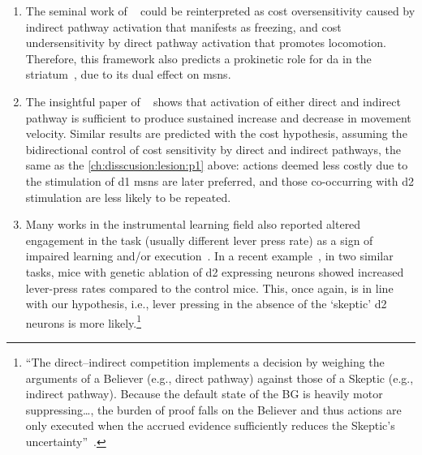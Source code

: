 \begin{enumerate}[noitemsep, label=\Roman*.]
    \item \label{ch:disscusion:lesion:p1} The seminal work of \citeauthor{Kravitz2010Nature}~\cite{Kravitz2010Nature} could be reinterpreted as cost oversensitivity caused by indirect pathway activation that manifests as freezing, and cost undersensitivity by direct pathway activation that promotes locomotion.
    Therefore, this framework also predicts a prokinetic role for \gls{da} in the striatum~\cite{Howe2016N}, due to its dual effect on \glspl{msn}.
    \item The insightful paper of ~\cite{Yttri2016Nature} shows that activation of either direct and indirect pathway is sufficient to produce sustained increase and decrease in movement velocity.
    Similar results are predicted with the cost hypothesis, assuming the bidirectional control of cost sensitivity by direct and indirect pathways, the same as the \autoref{ch:disscusion:lesion:p1} above:
    actions deemed less costly due to the stimulation of \gls{d1} \glspl{msn} are later preferred, and those co-occurring with \gls{d2} stimulation are less likely to be repeated.
    \item Many works in the instrumental learning field also reported altered engagement in the task (usually different lever press rate) as a sign of impaired learning and/or execution~\cite{Hart2018CurrBiol}.
    In a recent example~\cite{Matamales2020Sci}, in two similar tasks, mice with genetic ablation of \gls{d2} expressing neurons showed increased lever-press rates compared to the control mice.
    This, once again, is in line with our hypothesis, i.e., lever pressing in the absence of the `skeptic' \gls{d2} neurons is more likely.\footnote{
        ``The direct–indirect competition implements a decision by weighing the arguments of a Believer (e.g., direct pathway) against those of a Skeptic (e.g., indirect pathway).
        Because the default state of the BG is heavily motor suppressing\ldots, the burden of proof falls on the Believer and thus actions are only executed when the accrued evidence sufficiently reduces the Skeptic’s uncertainty''~\cite{Dunovan2016FrontNeurosci}.
    }
\end{enumerate}
